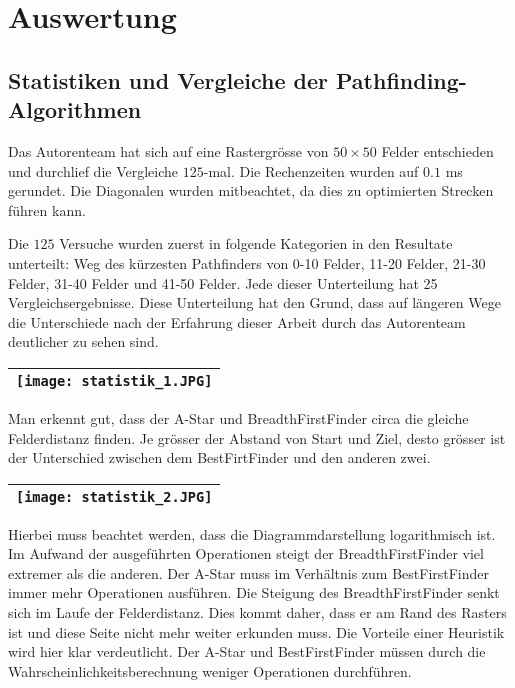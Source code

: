 \chapter{Auswertung}
\section{Statistiken und Vergleiche der Pathfinding-Algorithmen}
\begin{center}
\end{center}

Das Autorenteam hat sich auf eine Rastergrösse von $50\times 50$ Felder
entschieden und durchlief die Vergleiche $125$-mal. Die Rechenzeiten wurden
auf $0.1$ ms gerundet. Die Diagonalen wurden mitbeachtet, da dies zu
optimierten Strecken führen kann.

Die $125$ Versuche wurden zuerst in folgende Kategorien in den Resultate
unterteilt: Weg des kürzesten Pathfinders von 0-10 Felder, 11-20 Felder,
21-30 Felder, 31-40 Felder und 41-50 Felder. Jede dieser Unterteilung hat
25 Vergleichsergebnisse. Diese Unterteilung hat den Grund, dass auf
längeren Wege die Unterschiede nach der Erfahrung dieser Arbeit durch
das Autorenteam deutlicher zu sehen sind.

\begin{longtable}[]{@{}l@{}}
\toprule
\endhead
\texttt{[image: statistik\_1.JPG]}\tabularnewline
\bottomrule
\end{longtable}

Man erkennt gut, dass der A-Star und BreadthFirstFinder circa die gleiche
Felderdistanz finden. Je grösser der Abstand von Start und Ziel, desto grösser ist der Unterschied zwischen dem BestFirtFinder und den anderen zwei.

\begin{longtable}[]{@{}l@{}}
\toprule
\endhead
\texttt{[image: statistik\_2.JPG]}\tabularnewline
\bottomrule
\end{longtable}

Hierbei muss beachtet werden, dass die Diagrammdarstellung logarithmisch ist. Im Aufwand der
ausgeführten Operationen steigt der BreadthFirstFinder viel extremer als
die anderen. Der A-Star muss im Verhältnis zum BestFirstFinder immer
mehr Operationen ausführen. Die Steigung des BreadthFirstFinder senkt
sich im Laufe der Felderdistanz. Dies kommt daher, dass er am Rand des
Rasters ist und diese Seite nicht mehr weiter erkunden muss. Die
Vorteile einer Heuristik wird hier klar verdeutlicht. Der A-Star und
BestFirstFinder müssen durch die Wahrscheinlichkeitsberechnung weniger
Operationen durchführen.

